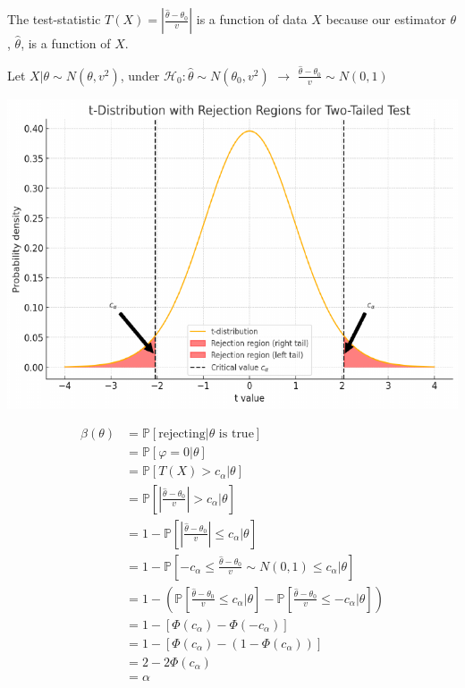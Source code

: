 \documentclass{article}
\begin{document}
\begin{note}
  The test-statistic $T (X) = \left| \frac{\hat{\theta} - \theta_0}{v}
  \right|$ is a function of data $X$ because our estimator $\theta$,
  $\hat{\theta}$, is a function of $X$.
\end{note}

\begin{example}
  Let $X | \theta \sim N (\theta, v^2)$, under $\mathcal{H}_0 :
  \hat{\theta} \sim N (\theta_0, v^2)$ $\rightarrow$ $\frac{\hat{\theta} -
  \theta_0}{v} \sim N (0, 1)$
\end{example}

\includegraphics[width=\textwidth]{Econometrics-1.pdf}

\begin{align*}
  \beta (\theta) & = \mathbb{P} [\text{rejecting} | \theta \text{ is}
  \text{ true}]\\
  & = \mathbb{P} [\varphi = 0 | \theta]\\
  & = \mathbb{P} [T (X) > c_{\alpha} | \theta]\\
  & = \mathbb{P} \left[ \left| \frac{\hat{\theta} - \theta_0}{v} \right| >
  c_{\alpha} | \theta \right]\\
  & = 1 - \mathbb{P} \left[ \left| \frac{\hat{\theta} - \theta_0}{v}
  \right| \leq c_{\alpha} | \theta \right]\\
  & = 1 - \mathbb{P} \left[ - c_{\alpha} \leq \frac{\hat{\theta} -
  \theta_0}{v} \sim N (0, 1) \leq c_{\alpha} | \theta \right]\\
  & = 1 - \left( \mathbb{P} \left[ \frac{\hat{\theta} - \theta_0}{v} \leq
  c_{\alpha} | \theta \right] - \mathbb{P} \left[
  \frac{\hat{\theta} - \theta_0}{v} \leq - c_{\alpha} | \theta
  \right] \right)\\
  & = 1 - [\Phi (c_{\alpha}) - \Phi (- c_{\alpha})]\\
  & = 1 - [\Phi (c_{\alpha}) - (1 - \Phi (c_{\alpha}))]\\
  & = 2 - 2 \Phi (c_{\alpha})\\
  & = \alpha
\end{align*}
\end{document}
